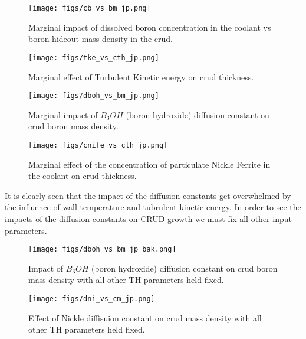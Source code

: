 \documentclass[10pt,a4paper]{report}
\begin{document}
\begin{figure}
    \centering
    \begin{minipage}{.5\textwidth}
        \centering
        \texttt{[image: figs/cb\_vs\_bm\_jp.png]}
        \caption{Marginal impact of dissolved boron concentration in the coolant vs boron hideout mass density in the crud.}
    \end{minipage}%
    \begin{minipage}{.5\textwidth}
        \centering
        \texttt{[image: figs/tke\_vs\_cth\_jp.png]}
        \caption{Marginal effect of Turbulent Kinetic energy on crud thickness.}
    \end{minipage}
\end{figure}

\begin{figure}
    \centering
    \begin{minipage}{.5\textwidth}
        \centering
        \texttt{[image: figs/dboh\_vs\_bm\_jp.png]}
        \caption{Marginal impact of $B_3OH$ (boron hydroxide) diffusion constant on crud boron mass density.}
    \end{minipage}%
    \begin{minipage}{.5\textwidth}
        \centering
        \texttt{[image: figs/cnife\_vs\_cth\_jp.png]}
        \caption{Marginal effect of the concentration of particulate Nickle Ferrite in the coolant on crud thickness.}
    \end{minipage}
\end{figure}

It is clearly seen that the impact of the diffusion constants get overwhelmed by the influence of wall temperature and tubrulent kinetic energy.  In order to see the impacts of the diffusion constants on CRUD growth we must fix all other input parameters.

\begin{figure}
    \centering
    \begin{minipage}{.5\textwidth}
        \centering
        \texttt{[image: figs/dboh\_vs\_bm\_jp\_bak.png]}
        \caption{Impact of $B_3OH$ (boron hydroxide) diffusion constant on crud boron mass density with all other TH parameters held fixed.}
    \end{minipage}%
    \begin{minipage}{.5\textwidth}
        \centering
        \texttt{[image: figs/dni\_vs\_cm\_jp.png]}
        \caption{Effect of Nickle diffisuion constant on crud mass density with all other TH parameters held fixed.}
    \end{minipage}
\end{figure}
\end{document}
